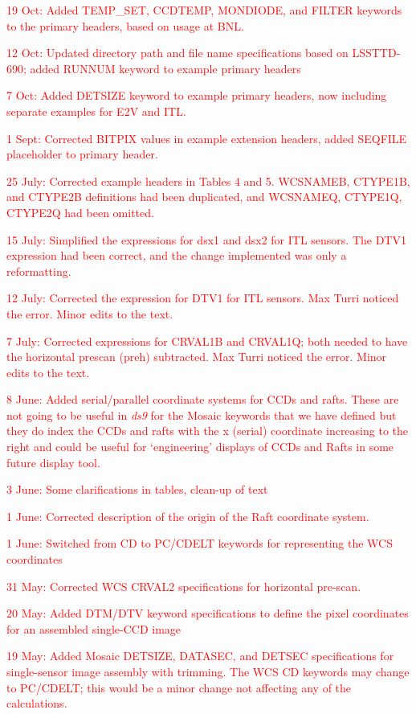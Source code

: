 \documentclass{article}[12pt]
\newcommand{\red}{\textcolor{red}}
\begin{document}
\red{19 Oct:  Added TEMP\_SET, CCDTEMP, MONDIODE, and FILTER keywords to the primary headers, based on usage at BNL.}

\red{12 Oct:  Updated directory path and file name specifications based on LSSTTD-690; added RUNNUM keyword to example primary headers}

\red{7 Oct:  Added DETSIZE keyword to example primary headers, now including separate examples for E2V and ITL.}

\red{1 Sept: Corrected BITPIX values in example extension headers, added SEQFILE placeholder to primary header.}

\red{25 July: Corrected example headers in Tables 4 and 5.  WCSNAMEB, CTYPE1B, and CTYPE2B definitions had been duplicated, and WCSNAMEQ, CTYPE1Q, CTYPE2Q had been omitted.}

\red{15 July: Simplified the expressions for dsx1 and dsx2 for ITL sensors.  The DTV1 expression had been correct, and the change implemented was only a reformatting.}
  
\red{12 July:  Corrected the expression for DTV1 for ITL sensors.  Max Turri noticed the error.  Minor edits to the text.}

\red{7 July:  Corrected expressions for CRVAL1B and CRVAL1Q; both needed to have the horizontal prescan (preh) subtracted.  Max Turri noticed the error.  Minor edits to the text.}

\red{8 June:  Added serial/parallel coordinate systems for CCDs and rafts.  These are not going to be useful in {\it ds9} for the Mosaic keywords that we have defined but they do index the CCDs and rafts with the x (serial) coordinate increasing to the right and could be useful for `engineering' displays of CCDs and Rafts in some future display tool.}  
 
\red{3 June:  Some clarifications in tables, clean-up of text}

\red{1 June:  Corrected description of the origin of the Raft coordinate system.}

\red{1 June:  Switched from CD to PC/CDELT keywords for representing the WCS coordinates} 

\red{31 May:  Corrected WCS CRVAL2 specifications for horizontal pre-scan.}

\red{20 May:  Added DTM/DTV keyword specifications to define the pixel coordinates for an assembled single-CCD image}

\red{19 May:  Added Mosaic DETSIZE, DATASEC, and DETSEC specifications for single-sensor image assembly with trimming.  The WCS CD keywords may change to PC/CDELT; this would be a minor change not affecting any of the calculations.}
\end{document}
